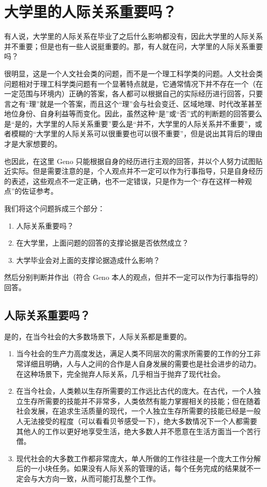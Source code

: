 \section{大学里的人际关系重要吗？}\label{sec:Uncategorized/IsUniversityInterpersonImportant}
%
%
    有人说，大学里的人际关系在毕业了之后什么影响都没有，因此大学里的人际关系并不重要；但是也有一些人说挺重要的。那，有人就在问，大学里的人际关系重要吗？

    很明显，这是一个人文社会类的问题，而不是一个理工科学类的问题。人文社会类问题相对于理工科学类问题有一个显著特点就是，它通常情况下并不存在一个（在一定范围与环境内）正确的答案，各人都可以根据自己的实际经历进行回答，只要言之有“理”就是一个答案，而且这个“理”会与社会变迁、区域地理、时代改革甚至地位身份、自身利益等而变化。因此，虽然这种“是”或“否”式的判断题的回答要么是“是的，大学里的人际关系重要”要么是“并不，大学里的人际关系并不重要”，或者模糊的“大学里的人际关系可以很重要也可以很不重要”，但是说出其背后的理由才是大家想要的。

    也因此，在这里 Geno 只能根据自身的经历进行主观的回答，并以个人努力试图贴近实际。但是需要注意的是，个人观点并不一定可以作为行事指导，只是自身经历的表述，这些观点不一定正确，也不一定错误，只是作为一个“存在这样一种观点”的佐证参考。

    我们将这个问题拆成三个部分：
    \begin{enumerate}
        \item 人际关系重要吗？
        \item 在大学里，上面问题的回答的支撑论据是否依然成立？
        \item 大学毕业会对上面的支撑论据造成什么影响？
    \end{enumerate}
    然后分别判断并作出（符合 Geno 本人的观点，但并不一定可以作为行事指导的）回答。

    \subsection{人际关系重要吗？}\label{subsec:Uncategorized/IsUniversityInterpersonImportant/IsInterpersonImportant}
        是的，在当今社会的大多数场景下，人际关系都是重要的。
        \begin{enumerate}
            \item 当今社会的生产力高度发达，满足人类不同层次的需求所需要的工作的分工非常详细且明确，人与人之间的合作是人自身发展的需要也是社会进步的动力。在这种场景下，完全抛弃人际关系，几乎相当于抛弃了现代社会。
            \item 在当今社会，人类赖以生存所需要的工作远比古代的庞大。在古代，一个人独立生存所需要的技能并不非常多，人类依然有能力掌握相关的技能；但在随着社会发展，在追求生活质量的现代，一个人独立生存所需要的技能已经是一般人无法接受的程度（可以看看贝爷感受一下），绝大多数情况下一个人都需要其他人的工作以更好地享受生活，绝大多数人并不愿意在生活方面当一个苦行僧。
            \item 现代社会的大多数工作都非常庞大，单人所做的工作往往是一个庞大工作分解后的一小块任务。如果没有人际关系的管理的话，每个任务完成的结果就不一定会与大方向一致，从而可能打乱整个工作。
        \end{enumerate}


